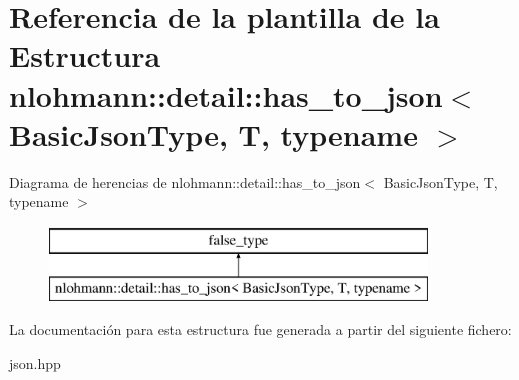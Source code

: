 \hypertarget{structnlohmann_1_1detail_1_1has__to__json}{}\section{Referencia de la plantilla de la Estructura nlohmann\+:\+:detail\+:\+:has\+\_\+to\+\_\+json$<$ Basic\+Json\+Type, T, typename $>$}
\label{structnlohmann_1_1detail_1_1has__to__json}
Diagrama de herencias de nlohmann\+:\+:detail\+:\+:has\+\_\+to\+\_\+json$<$ Basic\+Json\+Type, T, typename $>$\begin{figure}[H]
\begin{center}
\leavevmode
\includegraphics[height=2.000000cm]{structnlohmann_1_1detail_1_1has__to__json}
\end{center}
\end{figure}


La documentación para esta estructura fue generada a partir del siguiente fichero\+:\begin{DoxyCompactItemize}
\item 
json.\+hpp\end{DoxyCompactItemize}
